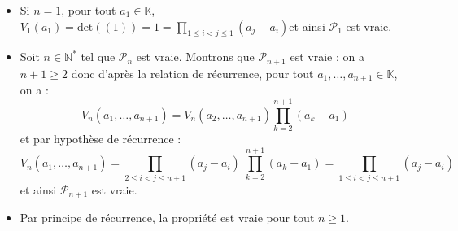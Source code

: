 \documentclass[french,11pt,twoside]{VcCours}
\begin{document}
\begin{Demonstration}{}
\begin{itemize}
\item Si $n=1$, pour tout $a_1 \in \mathbb{K}$, $V_1(a_1) = \textrm{det}((1)) =1 =\prod_{1 \leq i<j \leq 1} (a_j-a_i)$et ainsi $\mathcal{P}_1$ est vraie.
\item Soit $n \in \mathbb{N}^*$ tel que $\mathcal{P}_n$ est vraie. Montrons que $\mathcal{P}_{n+1}$ est vraie : on a $n+1 \geq 2$ donc d'après la relation de récurrence, pour tout $a_1, \ldots, a_{n+1} \in \mathbb{K}$, on a :
$$ V_n(a_1, \ldots, a_{n+1}) =   V_{n}(a_2, \ldots, a_{n+1}) \prod_{k=2}^{n+1} (a_k-a_1)$$
et par hypothèse de récurrence :
$$V_n(a_1, \ldots, a_{n+1}) =  \prod_{2 \leq i<j \leq n+1} (a_j-a_i) \;  \prod_{k=2}^{n+1} (a_k-a_1)  =  \prod_{1 \leq i<j \leq n+1} (a_j-a_i)$$
et ainsi $\mathcal{P}_{n+1}$ est vraie.
\item Par principe de récurrence, la propriété est vraie pour tout $n \geq 1$.
\end{itemize}

\end{Demonstration}

%
\end{document}

